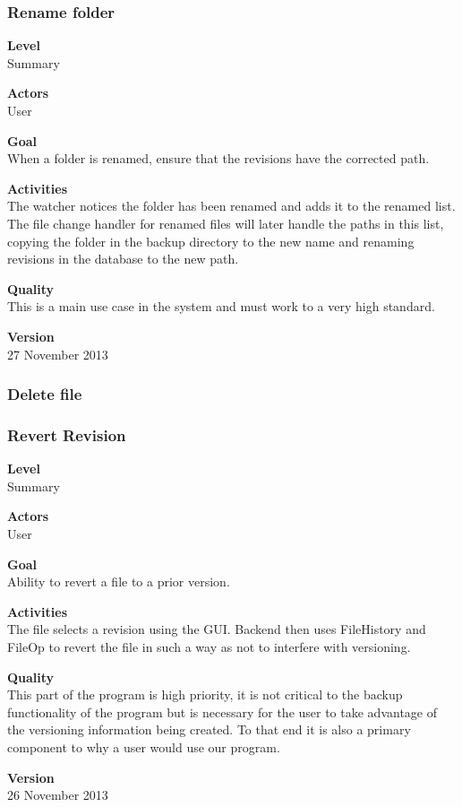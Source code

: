 \documentclass[12pt,a4paper]{article}
\newcommand\todonote[1]{{\color{red}\fbox{\parbox{\dimexpr\linewidth-2\fboxsep-2\fboxrule}{\textit\large{\textbf{TODO: #1}}}}}}
\begin{document}
\subsubsection{Rename folder}
\begin{description}
	\item \textbf{Level} \\
	Summary
	\item \textbf{Actors} \\
	User
	\item \textbf{Goal} \\
	When a folder is renamed, ensure that the revisions have the corrected path.
	\item \textbf{Activities} \\
	The watcher notices the folder has been renamed and adds it to the renamed list. The file change handler for renamed files will later handle the paths in this list, copying the folder in the backup directory to the new name and renaming revisions in the database to the new path.
	\item \textbf{Quality} \\
	This is a main use case in the system and must work to a very high standard.
	\item \textbf{Version} \\
	27 November 2013
\end{description}

\subsubsection{Delete file}
\todonote{Butler. Adapt from M4.}

\subsubsection{Revert Revision} 
\begin{description}
	\item \textbf{Level}  \\
	Summary
	\item \textbf{Actors} \\
	User
	\item \textbf{Goal} \\
	Ability to revert a file to a prior version.
	\item \textbf{Activities} \\
	The file selects a revision using the GUI. Backend then uses FileHistory and FileOp to revert the file in such a way as not to interfere with versioning. 
	\item \textbf{Quality} \\
	This part of the program is high priority, it is not critical to the backup functionality of the program but is necessary for the user to take advantage of the versioning information being created.
	 To that end it is also a primary component to why a user would use our program. 
	\item \textbf{Version} \\
	26 November 2013	
\end{description}
\end{document}
